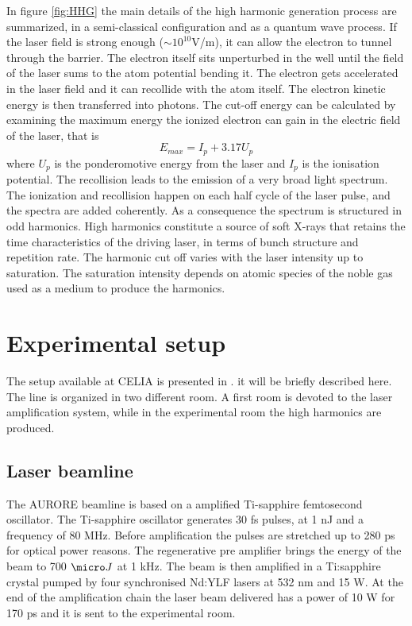 In figure \ref{fig:HHG} the main details of the high harmonic generation process are summarized, in a semi-classical configuration and as a quantum wave process.
If the laser field is strong enough ($\sim 10^{10}$V/m), it can allow the electron to tunnel through the barrier. The electron itself sits unperturbed in the well until the field of the laser sums to the atom potential bending it.
The electron gets accelerated in the laser field and it can recollide with the atom itself. The electron kinetic energy is then transferred into photons.
The cut-off energy can be calculated by examining the maximum energy the ionized electron can gain in the electric field of the laser, that is
\begin{equation}
E_{max} = I_{p}+3.17U_{p}
\end{equation}
where $U_{p}$ is the ponderomotive energy from the laser and $I_{p}$ is the ionisation potential. The recollision leads to the emission of a very broad light spectrum.
The ionization and recollision happen on each half cycle of the laser pulse, and the spectra are added coherently. As a consequence the spectrum is structured in odd harmonics.
High harmonics constitute a source of soft X-rays that retains the time characteristics of the driving laser, in terms of bunch structure and repetition rate. 
The harmonic cut off varies with the laser intensity up to saturation. The saturation intensity depends on atomic species of the noble gas used as a medium to produce the harmonics.

\section{Experimental setup}
The setup available at CELIA is presented in \cite{Martin2001}. it will be briefly described here. The line is organized in two different room. A first room is devoted to the laser amplification system, while in the experimental room the high harmonics are produced.
\subsection{Laser beamline}
The AURORE beamline is based on a amplified Ti-sapphire femtosecond oscillator. 
The Ti-sapphire oscillator generates 30 fs pulses, at 1 nJ and a frequency of 80 MHz. Before amplification the pulses are stretched up to 280 ps for optical power reasons.
The regenerative pre amplifier brings the energy of the beam to 700 $\micro J$ at 1 kHz.
The beam is then amplified in a Ti:sapphire crystal pumped by four synchronised Nd:YLF lasers at 532 nm and 15 W.
At the end of the amplification chain the laser beam delivered has a power of 10 W for 170 ps and it is sent to the experimental room.
